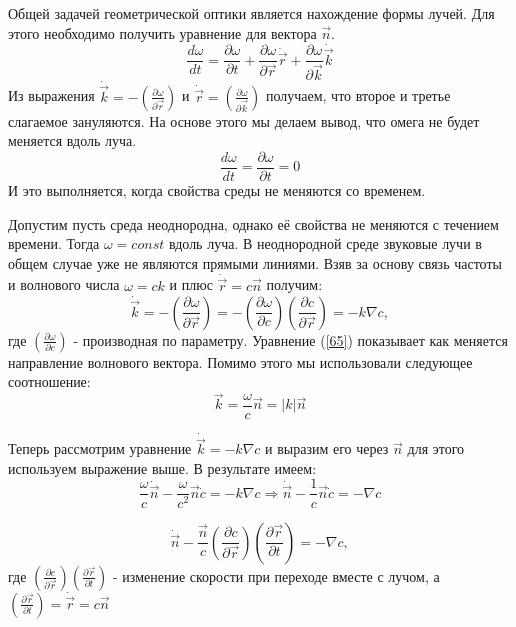 \documentclass[14pt,a4paper,oneside]{extarticle}	%
\newcommand{\bracket}[1] {\left( #1 \right) } %
\newcommand{\dif}[2] {\bracket{ \frac{\partial #1}{\partial #2} }}
\newcommand{\diff}[2] {\frac{\partial #1}{\partial #2} }
\begin{document}
Общей задачей геометрической оптики является нахождение формы лучей. Для этого необходимо получить уравнение для вектора $ \vec{n} $.
\begin{equation*}
\frac{d \omega}{dt} = \diff{\omega}{t} + \diff{\omega}{\vec{r}}\dot{\vec{r}} + \diff{\omega}{\vec{k}}\dot{\vec{k}}
\end{equation*}
 Из выражения $ \dot{\vec{k}} = -\dif{\omega}{\vec{r}}  $ и $ \dot{\vec{r}} = \dif{\omega}{\vec{k}} $ получаем, что второе и третье слагаемое зануляются.
 На основе этого мы делаем вывод, что омега не будет меняется вдоль луча.
 \begin{equation*}
 \frac{d \omega}{dt} = \diff{\omega}{t} = 0
 \end{equation*}
 И это выполняется, когда свойства среды не меняются со временем.
 
 Допустим пусть среда неоднородна, однако её свойства не меняются с течением времени.
 Тогда $ \omega = const $ вдоль луча.
 В неоднородной среде звуковые лучи в общем случае уже не являются прямыми линиями. Взяв за основу связь частоты и волнового числа 
 $ \omega = ck $ и плюс $ \dot{\vec{r}} = c\vec{n} $ получим:
  \begin{equation}\label{65}
 \dot{\vec{k}} = -\dif{\omega}{\vec{r}} = -\dif{\omega}{c}\dif{c}{\vec{r}} = -k\nabla c ,
 \end{equation}
 где $ \dif{\omega}{c} $ - производная по параметру. Уравнение (\ref{65}) показывает как меняется направление волнового вектора.
 Помимо этого мы использовали следующее соотношение: 
 \begin{equation*}
 \vec{k} = \frac{\omega}{c}\vec{n}  = |k|\vec{n}
 \end{equation*}

 Теперь рассмотрим уравнение $ \dot{\vec{k}} = -k\nabla c $ и выразим его через $ \vec{n} $ для этого используем выражение выше.
 В результате имеем:
\begin{equation*}
\frac{\omega}{c}\dot{\vec{n}} - \frac{\omega}{c^{2}}\vec{n}\dot{c} = - k\nabla c \Rightarrow \dot{\vec{n}} -  \frac{1}{c}\vec{n}\dot{c} = -\nabla c
\end{equation*}
 
 
 \begin{equation*}
\dot{\vec{n}} -  \frac{\vec{n}}{c}\dif{c}{\vec{r}}\dif{\vec{r}}{t} = -\nabla c,
 \end{equation*}
 где $ \dif{c}{\vec{r}}\dif{\vec{r}}{t} $ - изменение скорости при переходе вместе с лучом, а $ \dif{\vec{r}}{t} =  \dot{\vec{r}} = c\vec{n} $
 
\end{document}
